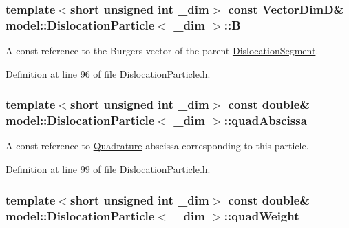 \subsubsection[{B}]{\setlength{\rightskip}{0pt plus 5cm}template$<$short unsigned int \+\_\+dim$>$ const {\bf Vector\+Dim\+D}\& {\bf model\+::\+Dislocation\+Particle}$<$ \+\_\+dim $>$\+::B}\label{structmodel_1_1_dislocation_particle_a3a8d05e9d1d7a9925be1a20dece52310}


A const reference to the Burgers vector of the parent \hyperlink{classmodel_1_1_dislocation_segment}{Dislocation\+Segment}. 



Definition at line 96 of file Dislocation\+Particle.\+h.

\hypertarget{structmodel_1_1_dislocation_particle_a8c6fc5a8adbbfd82309b87e1f69d246b}{}
\subsubsection[{quad\+Abscissa}]{\setlength{\rightskip}{0pt plus 5cm}template$<$short unsigned int \+\_\+dim$>$ const double\& {\bf model\+::\+Dislocation\+Particle}$<$ \+\_\+dim $>$\+::quad\+Abscissa}\label{structmodel_1_1_dislocation_particle_a8c6fc5a8adbbfd82309b87e1f69d246b}


A const reference to \hyperlink{structmodel_1_1_quadrature}{Quadrature} abscissa corresponding to this particle. 



Definition at line 99 of file Dislocation\+Particle.\+h.

\hypertarget{structmodel_1_1_dislocation_particle_a1973a8355d41b8d97ab4dd7f2b08ad8f}{}
\subsubsection[{quad\+Weight}]{\setlength{\rightskip}{0pt plus 5cm}template$<$short unsigned int \+\_\+dim$>$ const double\& {\bf model\+::\+Dislocation\+Particle}$<$ \+\_\+dim $>$\+::quad\+Weight}\label{structmodel_1_1_dislocation_particle_a1973a8355d41b8d97ab4dd7f2b08ad8f}


